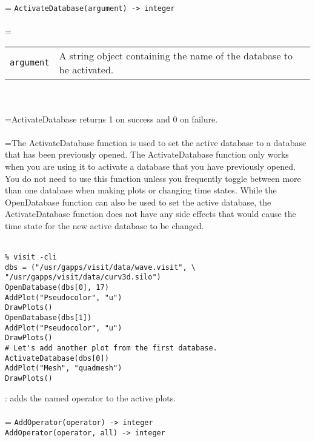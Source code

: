 \documentclass[10pt,a4paper]{report}
\begin{document}
 \\ 
\hangindent=\parindent 
\verb!ActivateDatabase(argument) -> integer!\\ [-3mm]

 \\ 
\hangindent=\parindent 
\begin{tabular}{lp{9cm}}
\verb!argument! & A string object containing the name of the database to be activated. \\
\end{tabular} \\[-2mm]


 \\ 
\hangindent=\parindent ActivateDatabase returns 1 on success and 0 on failure. \\[-3mm] 

 \\ 
\hangindent=\parindent The ActivateDatabase function is used to set the active database to a database that has been previously opened. The ActivateDatabase function only works when you are using it to activate a database that you have previously opened. You do not need to use this function unless you frequently toggle between more than one database when making plots or changing time states. While the OpenDatabase function can also be used to set the active database, the ActivateDatabase function does not have any side effects that would cause the time state for the new active database to be changed. \\[-3mm] 

\\[-6mm]
\begin{verbatim}% visit -cli
dbs = ("/usr/gapps/visit/data/wave.visit", \
"/usr/gapps/visit/data/curv3d.silo")
OpenDatabase(dbs[0], 17)
AddPlot("Pseudocolor", "u")
DrawPlots()
OpenDatabase(dbs[1])
AddPlot("Pseudocolor", "u")
DrawPlots()
# Let's add another plot from the first database.
ActivateDatabase(dbs[0])
AddPlot("Mesh", "quadmesh")
DrawPlots()
\end{verbatim}
\newpage


{}
: adds the named operator to the active plots.\\[-3mm]

 \\ 
\hangindent=\parindent 
\verb!AddOperator(operator) -> integer!\\ 
\verb!AddOperator(operator, all) -> integer!\\ [-3mm]
\end{document}
